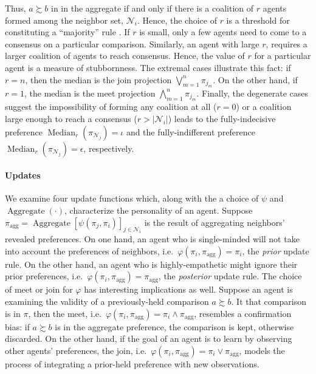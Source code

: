 \documentclass[conference]{ieeeconf}
\newcommand{\N}{\mathcal{N}}
\newcommand{\prefers}{\succsim}
\newcommand{\join}{\vee}
\newcommand{\meet}{\wedge}
\newcommand{\bigjoin}{\bigvee}
\newcommand{\bigmeet}{\bigwedge}
\DeclareMathOperator{\Aggregate}{Aggregate}
\DeclareMathOperator{\Median}{Median}
\begin{document}
Thus, $a \prefers b$ in in the aggregate if and only if there is a coalition of $r$ agents formed among the neighbor set, $\N_i$. Hence, the choice of $r$ is a threshold for constituting a ``majority'' rule \cite{buchanan1965calculus}. If $r$ is small, only a few agents need to come to a consensus on a particular comparison. Similarly, an agent with large $r$, requires a larger coalition of agents to reach consensus. Hence, the value of $r$ for a particular agent is a measure of stubbornness. The extremal cases illustrate this fact: if $r= n$, then the median is the join projection $\bigjoin_{m=1}^n \pi_{j_m}$. On the other hand, if $r=1$, the median is the meet projection $\bigmeet_{m=1}^n \pi_{j_m}$. Finally, the degenerate cases suggest the impossibility of forming any coalition at all ($r=0$) or a coalition large enough to reach a consensus ($r > |\N_i|$) leads to the fully-indecisive preference $\Median_r(\pi_{\N_j}) = \iota$ and the fully-indifferent preference $\Median_r(\pi_{\N_j}) = \epsilon$, respectively.

\paragraph*{Updates}
We examine four update functions which, along with the a choice of $\psi$ and $\Aggregate(\cdot)$, characterize the personality of an agent. Suppose $\pi_{\mathrm{agg}} = \Aggregate\left[\psi(\pi_j,\pi_i)\right]_{j \in \N_i}$ is the result of aggregating neighbors' revealed preferences. On one hand, an agent who is single-minded will not take into account the preferences of neighbors, i.e.~$\varphi(\pi_i,\pi_{\mathrm{agg}}) = \pi_i$, the \emph{prior} update rule. On the other hand, an agent who is highly-empathetic might ignore their prior preferences, i.e.~$\varphi(\pi_i,\pi_{\mathrm{agg}}) = \pi_{\mathrm{agg}}$, the \emph{posterior} update rule. The choice of meet or join for $\varphi$ has interesting implications as well. Suppose an agent is examining the validity of a previously-held comparison $a \prefers b$. It that comparison is in $\pi$, then the meet, i.e.~$\varphi(\pi_i,\pi_{\mathrm{agg}}) = \pi_i \meet \pi_{\mathrm{agg}}$, resembles a confirmation bias: if $a \prefers b$ is in the aggregate preference, the comparison is kept, otherwise discarded. On the other hand, if the goal of an agent is to learn by observing other agents' preferences, the join, i.e.~$\varphi(\pi_i,\pi_{\mathrm{agg}}) = \pi_i \join \pi_{\mathrm{agg}}$, models the process of integrating a prior-held preference with new observations.
\end{document}
